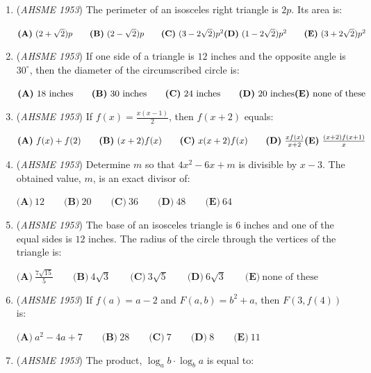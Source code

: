 \begin{enumerate}
	\item (\textit{AHSME 1953}) The perimeter of an isosceles right triangle is $2p$. Its area is: 


 $\textbf{(A)}\ (2+\sqrt{2})p \qquad \textbf{(B)}\ (2-\sqrt{2})p \qquad \textbf{(C)}\ (3-2\sqrt{2})p^2\\  \textbf{(D)}\ (1-2\sqrt{2})p^2\qquad \textbf{(E)}\ (3+2\sqrt{2})p^2$


	\item (\textit{AHSME 1953}) If one side of a triangle is $12$ inches and the opposite angle is $30^{\circ}$, then the diameter of the circumscribed circle is: 


 $\textbf{(A)}\ 18\text{ inches} \qquad \textbf{(B)}\ 30\text{ inches} \qquad \textbf{(C)}\ 24\text{ inches} \qquad \textbf{(D)}\ 20\text{ inches}\\ \textbf{(E)}\ \text{none of these}$


	\item (\textit{AHSME 1953}) If $f(x)=\frac{x(x-1)}{2}$, then $f(x+2)$ equals: 


 $\textbf{(A)}\ f(x)+f(2) \qquad \textbf{(B)}\ (x+2)f(x) \qquad \textbf{(C)}\ x(x+2)f(x) \qquad \textbf{(D)}\ \frac{xf(x)}{x+2}\\ \textbf{(E)}\ \frac{(x+2)f(x+1)}{x}$


	\item (\textit{AHSME 1953}) Determine $m$ so that $4x^2-6x+m$ is divisible by $x-3$. The obtained value, $m$, is an exact divisor of: 


 $\textbf{(A)}\ 12 \qquad \textbf{(B)}\ 20 \qquad \textbf{(C)}\ 36 \qquad \textbf{(D)}\ 48 \qquad \textbf{(E)}\ 64$


	\item (\textit{AHSME 1953}) The base of an isosceles triangle is $6$ inches and one of the equal sides is $12$ inches. 
The radius of the circle through the vertices of the triangle is: 


 $\textbf{(A)}\ \frac{7\sqrt{15}}{5} \qquad \textbf{(B)}\ 4\sqrt{3} \qquad \textbf{(C)}\ 3\sqrt{5} \qquad \textbf{(D)}\ 6\sqrt{3}\qquad \textbf{(E)}\ \text{none of these}$


	\item (\textit{AHSME 1953}) If $f(a)=a-2$ and $F(a,b)=b^2+a$, then $F(3,f(4))$ is: 


 $\textbf{(A)}\ a^2-4a+7 \qquad \textbf{(B)}\ 28 \qquad \textbf{(C)}\ 7 \qquad \textbf{(D)}\ 8 \qquad \textbf{(E)}\ 11$


	\item (\textit{AHSME 1953}) The product, $\log_a b \cdot \log_b a$ is equal to: 



\end{enumerate}
